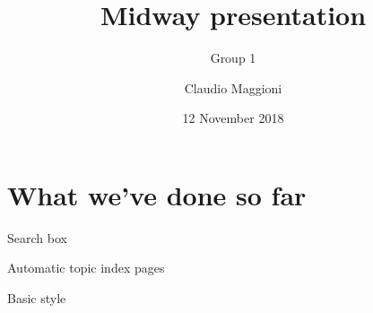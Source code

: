 \documentclass[10pt,aspectratio=169]{beamer}
\title{Midway presentation}
\subtitle{Group 1}
\date{12 November 2018}
\author{Claudio Maggioni}
\begin{document}
\maketitle

\begin{frame}[standout]
\end{frame}

\section{What we've done so far}


\begin{frame}[fragile]{Search box}
\vfill{}\vfill
\end{frame}


\begin{frame}[fragile]{Automatic topic index pages}
\vfill{}\vfill
\end{frame}


\begin{frame}[fragile]{Basic style}
\vfill{}\vfill
\end{frame}
\end{document}
